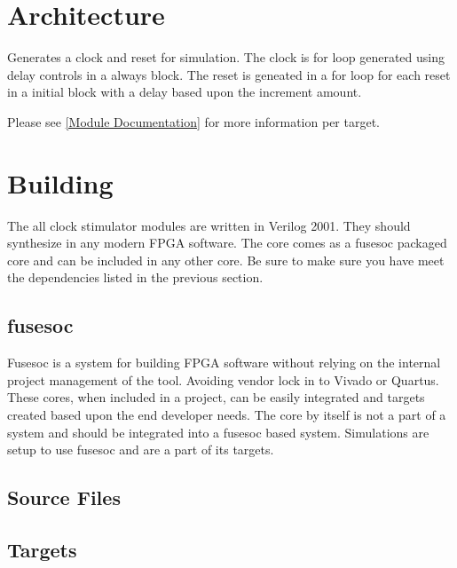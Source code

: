 % 

\section{Architecture}
\par
Generates a clock and reset for simulation. The clock is for loop generated using delay controls in a always block.
The reset is geneated in a for loop for each reset in a initial block with a delay based upon the increment amount.

Please see \ref{Module Documentation} for more information per target.

\section{Building}

\par
The all clock stimulator modules are written in Verilog 2001. They should synthesize in any modern FPGA software. The core comes as a fusesoc packaged core and can be
included in any other core. Be sure to make sure you have meet the dependencies listed in the previous section.

\subsection{fusesoc}
\par
Fusesoc is a system for building FPGA software without relying on the internal project management of the tool. Avoiding vendor lock in to Vivado or Quartus.
These cores, when included in a project, can be easily integrated and targets created based upon the end developer needs. The core by itself is not a part of
a system and should be integrated into a fusesoc based system. Simulations are setup to use fusesoc and are a part of its targets.

\subsection{Source Files}



\subsection{Targets} \label{targets}



